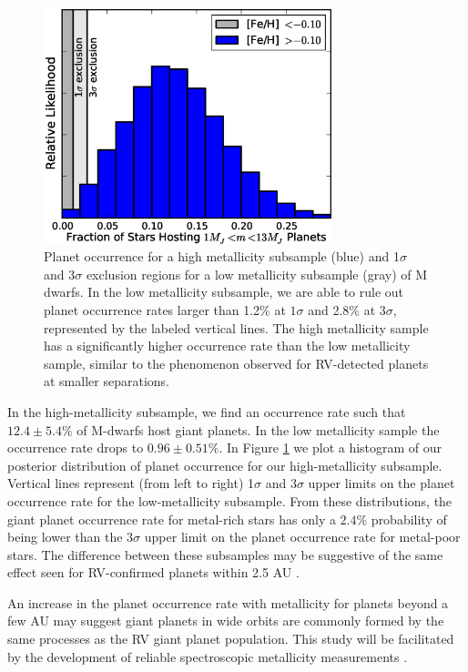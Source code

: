 \begin{figure}[htbp]
\centerline{\includegraphics[width=0.75\textwidth]{chapter3/f11.eps}}
\caption[Posterior planet occurrence for a high-metallicity and low-metallicity
subpopulation of M dwarfs]{ Planet occurrence for a high metallicity subsample (blue) and 1$\sigma$ and 3$\sigma$ exclusion regions for a low metallicity subsample (gray) of M dwarfs. In the low metallicity subsample, we are able to rule out planet occurrence rates larger than 1.2\% at $1\sigma$ and 2.8\% at $3\sigma$, represented by the labeled vertical lines. The high metallicity sample has a significantly higher occurrence rate than the low metallicity sample, similar to the phenomenon observed for RV-detected planets at smaller separations. 
  }
\label{Metals}
\end{figure}
In the high-metallicity subsample, we find an occurrence rate such that $12.4 \pm 5.4\%$ of M-dwarfs host giant planets. In the low metallicity sample the occurrence rate drops to $0.96 \pm 0.51\%$. In Figure \ref{Metals} we plot a histogram of our posterior distribution of planet occurrence for our high-metallicity subsample. Vertical lines represent (from left to right) 1$\sigma$ and 3$\sigma$ upper limits on the planet occurrence rate for the low-metallicity subsample. From these distributions, the giant planet occurrence rate for metal-rich stars has only a $2.4\%$ probability of being lower than the $3\sigma$ upper limit on the planet occurrence rate for metal-poor stars. The difference between these subsamples may be suggestive of the same effect seen for RV-confirmed planets within 2.5 AU \citep{JohnsonApps09, KOI254}. 


An increase in the planet occurrence rate with metallicity for planets beyond a few AU may suggest giant planets in wide orbits are commonly formed by the same processes as the RV giant planet population. This study will be facilitated by the development of reliable spectroscopic metallicity measurements \citep{RA10}.


